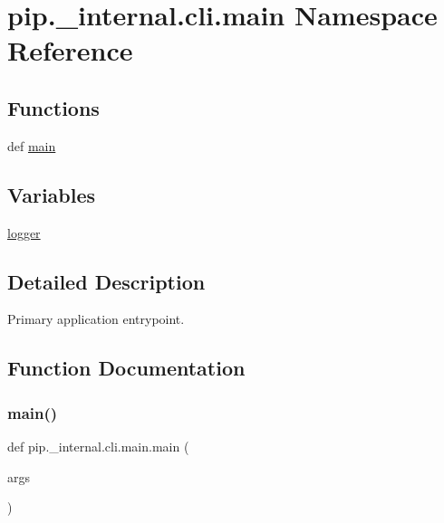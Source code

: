 \hypertarget{namespacepip_1_1__internal_1_1cli_1_1main}{}\section{pip.\+\_\+internal.\+cli.\+main Namespace Reference}
\label{namespacepip_1_1__internal_1_1cli_1_1main}
\subsection*{Functions}
\begin{DoxyCompactItemize}
\item 
def \hyperlink{namespacepip_1_1__internal_1_1cli_1_1main_aeb5b07c76c70f2cc2d9a5c12b900590a}{main}
\end{DoxyCompactItemize}
\subsection*{Variables}
\begin{DoxyCompactItemize}
\item 
\hyperlink{namespacepip_1_1__internal_1_1cli_1_1main_accc2ab24d4c62547f38ca6a5ff32dfc6}{logger}
\end{DoxyCompactItemize}


\subsection{Detailed Description}
\begin{DoxyVerb}Primary application entrypoint.
\end{DoxyVerb}
 

\subsection{Function Documentation}
\mbox{\label{namespacepip_1_1__internal_1_1cli_1_1main_aeb5b07c76c70f2cc2d9a5c12b900590a}} 
\subsubsection{\texorpdfstring{main()}{main()}}
{\footnotesize\ttfamily def pip.\+\_\+internal.\+cli.\+main.\+main (\begin{DoxyParamCaption}\item[{}]{args }\end{DoxyParamCaption})}



